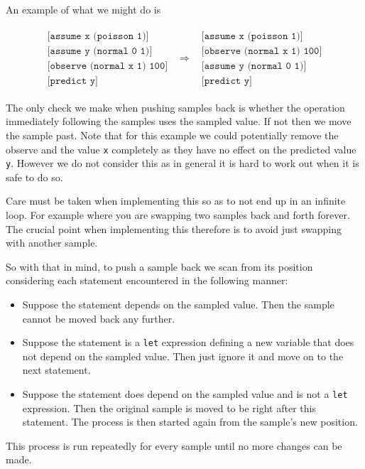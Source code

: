 \documentclass[a4paper]{article}
\newcommand{\optimization}[2]{
	\[
		\begin{array}{rcl}
			#1 & \Rightarrow & #2
		\end{array}
	\]
}
\begin{document}
An example of what we might do is
\optimization{
	\begin{array}{l}
		\texttt{[assume x (poisson 1)]} \\
		\texttt{[assume y (normal 0 1)]} \\
		\texttt{[observe (normal x 1) 100]} \\
		\texttt{[predict y]}
	\end{array}
}{
	\begin{array}{l}
		\texttt{[assume x (poisson 1)]} \\
		\texttt{[observe (normal x 1) 100]} \\
		\texttt{[assume y (normal 0 1)]} \\
		\texttt{[predict y]}
	\end{array}
}
The only check we make when pushing samples back is whether the operation immediately following the samples uses the sampled value. If not then we move the sample past. Note that for this example we could potentially remove the observe and the value \texttt{x} completely as they have no effect on the predicted value \texttt{y}. However we do not consider this as in general it is hard to work out when it is safe to do so.

Care must be taken when implementing this so as to not end up in an infinite loop. For example where you are swapping two samples back and forth forever. The crucial point when implementing this therefore is to avoid just swapping with another sample.

So with that in mind, to push a sample back we scan from its position considering each statement encountered in the following manner:
\begin{itemize}
\item
	Suppose the statement depends on the sampled value. Then the sample cannot be moved back any further.

\item
	Suppose the statement is a \texttt{let} expression defining a new variable that does not depend on the sampled value. Then just ignore it and move on to the next statement.

\item
	Suppose the statement does depend on the sampled value and is not a \texttt{let} expression. Then the original sample is moved to be right after this statement. The process is then started again from the sample's new position.

\end{itemize}
This process is run repeatedly for every sample until no more changes can be made.
\end{document}
